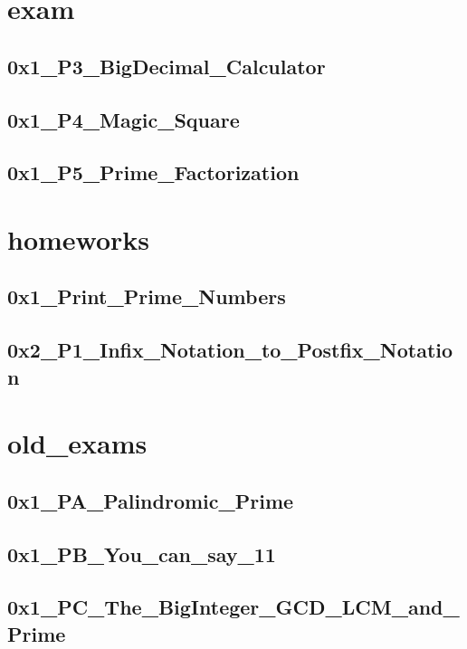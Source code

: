 \section{exam}
    \subsection{0x1_P3_BigDecimal_Calculator}
            
    \subsection{0x1_P4_Magic_Square}
        
    \subsection{0x1_P5_Prime_Factorization}
        

\section{homeworks}
    \subsection{0x1_Print_Prime_Numbers}
            
    \subsection{0x2_P1_Infix_Notation_to_Postfix_Notation}
        

\section{old_exams}
    \subsection{0x1_PA_Palindromic_Prime}
            
    \subsection{0x1_PB_You_can_say_11}
        
    \subsection{0x1_PC_The_BigInteger_GCD_LCM_and_Prime}
        
